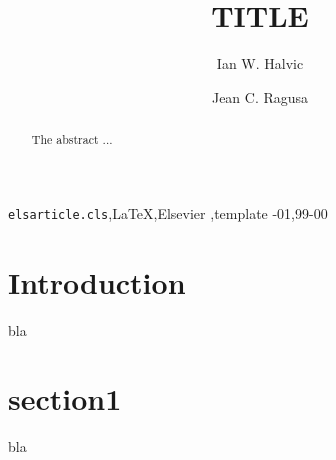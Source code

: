 \documentclass[review]{elsarticle}
\begin{document}

\begin{frontmatter}

\title{TITLE}


\author{Ian W. Halvic}
\author{Jean C. Ragusa}

\address{Department of Nuclear Engineering, Texas A\&M University, College Station, TX, USA}

\begin{abstract}
The abstract ... 
\end{abstract}

\begin{keyword}
\texttt{elsarticle.cls}\sep \LaTeX\sep Elsevier \sep template
-01\sep  99-00
\end{keyword}

\end{frontmatter}



\section{Introduction}
bla 

\section{section1}
\label{sec:section1}
bla
\end{document}
